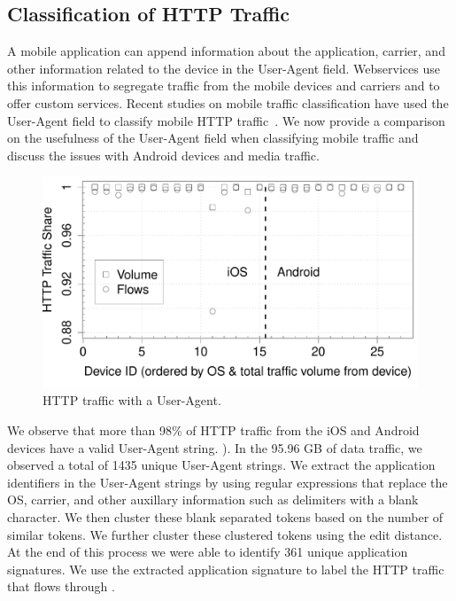 \subsection{Classification of HTTP Traffic}

A mobile application can append information about the application, carrier, and other information related to the device in the User-Agent field. 
Webservices use this information to segregate traffic from the mobile devices and carriers and to offer custom services.  
Recent studies on mobile traffic classification have used the User-Agent field to classify mobile HTTP traffic~\cite{qian:webcache, maier:mobtraffic, xu:appusage}.
We now provide a comparison on the usefulness of the User-Agent field when classifying mobile traffic and discuss the issues with Android devices and media traffic. 

\begin{figure}
\includegraphics[width=\columnwidth]{plots/appusage_someuseragent_traffic.pdf}
\caption{HTTP traffic with a User-Agent.}
\label{fig:http-classification-some-user-agent}
\end{figure}

We observe that more than 98\% of HTTP traffic from the iOS and Android devices have a valid User-Agent string. ).
In the 95.96 GB of data traffic, we observed a total of 1435 unique User-Agent strings.
We extract the application identifiers in the User-Agent strings by using regular expressions that replace the OS, carrier, and other auxillary information such as delimiters with a blank character.
We then cluster these blank separated tokens based on the number of similar tokens.
We further cluster these clustered tokens using the edit distance. 
At the end of this process we were able to identify 361 unique application signatures.
We use the extracted application signature to label the HTTP traffic that flows through \platname.

